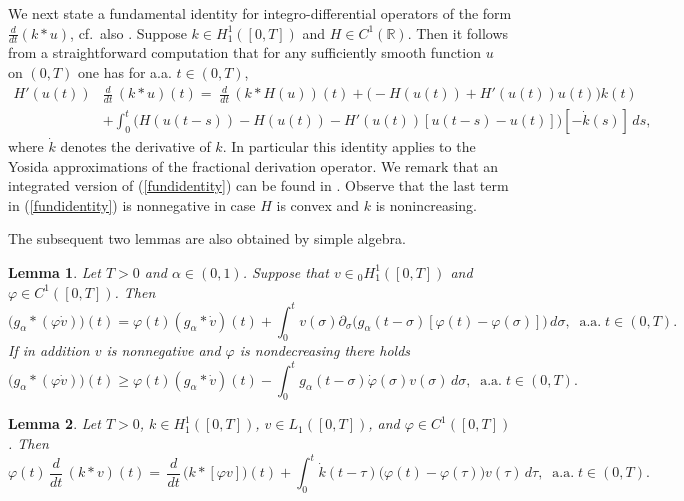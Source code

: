 \documentclass[10pt]{article}
\newtheorem{lemma}{Lemma}[section]
\newcommand{\iR}{\mathbb{R}}
\begin{document}
We next state a fundamental identity for integro-differential
operators of the form $\frac{d}{dt}(k\ast u)$, cf.\ also \cite{Za2}.
Suppose $k\in H^1_1([0,T])$ and $H\in C^1(\iR)$. Then it follows
from a straightforward computation that for any sufficiently smooth
function $u$ on $(0,T)$ one has for a.a. $t\in (0,T)$,
\begin{align} \label{fundidentity}
H'(u(t))&\frac{d}{dt}\,(k \ast u)(t) =\;\frac{d}{dt}\,(k\ast
H(u))(t)+
\Big(-H(u(t))+H'(u(t))u(t)\Big)k(t) \nonumber\\
 & +\int_0^t
\Big(H(u(t-s))-H(u(t))-H'(u(t))[u(t-s)-u(t)]\Big)[-\dot{k}(s)]\,ds,
\end{align}
where $\dot{k}$ denotes the derivative of $k$. In particular this
identity applies to the Yosida approximations of the fractional
derivation operator. We remark that an integrated version of
(\ref{fundidentity}) can be found in \cite[Lemma 18.4.1]{GLS}.
Observe that the last term in (\ref{fundidentity}) is nonnegative in
case $H$ is convex and $k$ is nonincreasing.

The subsequent two lemmas are also obtained by simple algebra.
\begin{lemma} \label{comm}
Let $T>0$ and $\alpha\in (0,1)$. Suppose that $v\in
{}_0H^1_1([0,T])$ and $\varphi\in C^1([0,T])$. Then
\[
\big(g_\alpha\ast(\varphi \dot{v}))(t)=\varphi(t)(g_\alpha\ast
\dot{v})(t)+\int_0^t
v(\sigma)\partial_\sigma\big(g_\alpha(t-\sigma)
[\varphi(t)-\varphi(\sigma)]\big)\,d\sigma,\;\;\mbox{a.a.}\;t\in
(0,T).
\]
If in addition $v$ is nonnegative and $\varphi$ is nondecreasing
there holds
\[
\big(g_\alpha\ast(\varphi \dot{v}))(t)\ge \varphi(t)(g_\alpha\ast
\dot{v})(t)-\int_0^t g_\alpha(t-\sigma)
\dot{\varphi}(\sigma)v(\sigma)\,d\sigma,\;\;\mbox{a.a.}\;t\in
(0,T).
\]
\end{lemma}
\begin{lemma} \label{comm2}
Let $T>0$, $k\in H^1_1([0,T])$, $v\in L_1([0,T])$, and $\varphi\in
C^1([0,T])$. Then
\[
\varphi(t)\,\frac{d}{dt}\,(k\ast v)(t)=\,\frac{d}{dt}\,\big(k\ast
[\varphi v]\big)(t)+\int_0^t
\dot{k}(t-\tau)\big(\varphi(t)-\varphi(\tau)\big)v(\tau)\,d\tau,\;\;\mbox{a.a.}\;t\in
(0,T).
\]

\end{lemma}
\end{document}

